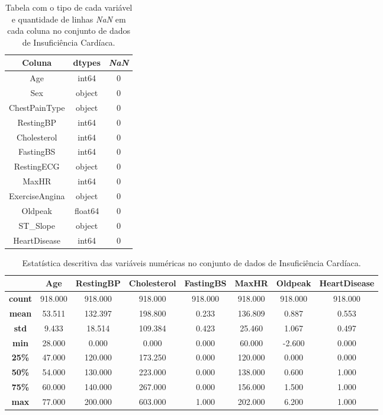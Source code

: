 \begin{table}[H]
\label{descritivo:heart}
\centering
\begin{tabular}{|c|c|c|}
\hline
\textbf{Coluna} & \textbf{dtypes} & \textbf{\textit{NaN}}\\
\hline
Age              &   int64 & 0\\
\hline
Sex              &  object & 0\\
\hline
ChestPainType    &  object & 0\\
\hline
RestingBP        &   int64 & 0\\
\hline
Cholesterol      &   int64 & 0\\
\hline
FastingBS        &   int64 & 0\\
\hline
RestingECG       &  object & 0\\
\hline
MaxHR            &   int64 & 0\\
\hline
ExerciseAngina   &  object & 0\\
\hline
Oldpeak          & float64 & 0\\
\hline
ST\_Slope        &   object & 0\\
\hline
HeartDisease     &   int64 & 0\\
\hline
\end{tabular}
\caption{Tabela com o tipo de cada variável e quantidade de linhas \textit{NaN} em cada coluna no conjunto de dados de Insuficiência Cardíaca.}
\end{table}
\begin{table}[H]
\label{descritivo:heart2}
\centering
\begin{tabular}{|c|c|c|c|c|c|c|c|}
\hline
& \textbf{Age}	& \textbf{RestingBP}	& \textbf{Cholesterol}	& \textbf{FastingBS}	& \textbf{MaxHR}	& \textbf{Oldpeak}	& \textbf{HeartDisease} \\
 \hline
\textbf{count}	& 918.000	& 918.000	& 918.000	& 918.000	& 918.000	& 918.000	& 918.000 \\
 \hline
\textbf{mean}	& 53.511	& 132.397	& 198.800	& 0.233	& 136.809	& 0.887	& 0.553 \\
 \hline
\textbf{std}	    & 9.433	& 18.514	& 109.384	& 0.423	& 25.460	& 1.067	& 0.497 \\
 \hline
\textbf{min}	    & 28.000	& 0.000	& 0.000	& 0.000	& 60.000	& -2.600	& 0.000 \\
 \hline
\textbf{25\%}	& 47.000	& 120.000	& 173.250	& 0.000	& 120.000	& 0.000	& 0.000 \\
 \hline
\textbf{50\%}	& 54.000	& 130.000	& 223.000	& 0.000	& 138.000	& 0.600	& 1.000 \\
 \hline
\textbf{75\%}	& 60.000	& 140.000	& 267.000	& 0.000	& 156.000	& 1.500	& 1.000 \\
 \hline
\textbf{max}	    & 77.000	& 200.000	& 603.000	& 1.000	& 202.000	& 6.200	& 1.000 \\
\hline
\end{tabular}
\caption{Estatística descritiva das variáveis numéricas no conjunto de dados de Insuficiência Cardíaca.}
\end{table}
